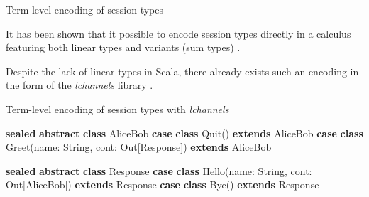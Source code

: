 \documentclass[ignorenonframetext,]{beamer}
\newenvironment{Shaded}{}{}
\newcommand{\CommentTok}[1]{\textcolor[rgb]{0.38,0.63,0.69}{\textit{#1}}}
\newcommand{\FunctionTok}[1]{\textcolor[rgb]{0.02,0.16,0.49}{#1}}
\newcommand{\KeywordTok}[1]{\textcolor[rgb]{0.00,0.44,0.13}{\textbf{#1}}}
\newcommand{\NormalTok}[1]{#1}
\newcommand{\StringTok}[1]{\textcolor[rgb]{0.25,0.44,0.63}{#1}}
\begin{document}
\begin{frame}{%
\protect\hypertarget{term-level-encoding-of-session-types}{%
Term-level encoding of session types}}

It has been shown that it possible to encode session types directly in a
calculus featuring both linear types and variants (sum types)
\cite{Wadler:2012:PS:2364527.2364568, Dardha:2012:STR:2370776.2370794}.

Despite the lack of linear types in Scala, there already exists such an
encoding in the form of the \emph{lchannels} library \cite{lchannels}.

\end{frame}

\begin{frame}[fragile]{%
\protect\hypertarget{term-level-encoding-of-session-types-with-lchannels}{%
Term-level encoding of session types with \emph{lchannels}}}

\begin{Shaded}
\begin{Highlighting}[]
\KeywordTok{sealed} \KeywordTok{abstract} \KeywordTok{class}\NormalTok{ AliceBob}
\KeywordTok{case} \KeywordTok{class} \FunctionTok{Quit}\NormalTok{() }\KeywordTok{extends}\NormalTok{ AliceBob}
\KeywordTok{case} \KeywordTok{class} \FunctionTok{Greet}\NormalTok{(name: String, cont: Out[Response]) }\KeywordTok{extends}\NormalTok{ AliceBob}

\KeywordTok{sealed} \KeywordTok{abstract} \KeywordTok{class}\NormalTok{ Response}
\KeywordTok{case} \KeywordTok{class} \FunctionTok{Hello}\NormalTok{(name: String, cont: Out[AliceBob]) }\KeywordTok{extends}\NormalTok{ Response}
\KeywordTok{case} \KeywordTok{class} \FunctionTok{Bye}\NormalTok{() }\KeywordTok{extends}\NormalTok{ Response}
\end{Highlighting}
\end{Shaded}

\end{frame}

\begin{frame}[fragile]

\begin{Shaded}
\end{Shaded}

\end{frame}
\end{document}

